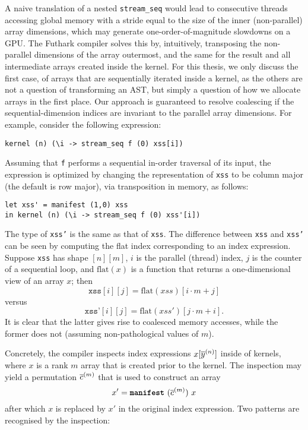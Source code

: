 A naive translation of a nested \lstinline{stream_seq} would lead to
consecutive threads accessing global memory with a stride equal to the
size of the inner (non-parallel) array dimensions, which may generate
one-order-of-magnitude slowdowns on a GPU.
%
The Futhark compiler solves this by, intuitively, transposing the
non-parallel dimensions of the array outermost, and the same for the
result and all intermediate arrays created inside the kernel.  For
this thesis, we only discuss the first case, of arrays that are
sequentially iterated inside a kernel, as the others are not a
question of transforming an AST, but simply a question of how we
allocate arrays in the first place.  Our approach is guaranteed to
resolve coalescing if the sequential-dimension indices are invariant
to the parallel array dimensions. For example, consider the following
expression:
\begin{lstlisting}[numbers=none]
kernel (n) (\i -> stream_seq f (0) xss[i])
\end{lstlisting}
Assuming that \lstinline{f} performs a sequential in-order traversal
of its input, the expression is optimized by changing the
representation of \texttt{xss} to be column major (the default is row
major), via transposition in memory, as follows:

\begin{lstlisting}[numbers=none]
let xss' = manifest (1,0) xss
in kernel (n) (\i -> stream_seq f (0) xss'[i])
\end{lstlisting}

The type of \texttt{xss'} is the same as that of \texttt{xss}.  The
difference between \texttt{xss} and \texttt{xss'} can be seen by
computing the flat index corresponding to an index expression.
Suppose \texttt{xss} has shape $[n][m]$, $i$ is the parallel (thread)
index, $j$ is the counter of a sequential loop, and $\textrm{flat}(x)$
is a function that returns a one-dimensional view of an array $x$;
then
\[
  \texttt{xss}[i][j] = \textrm{flat}(xss)[i\cdot{}m+j]
\]
versus
\[
  \texttt{xss'}[i][j] = \textrm{flat}(xss')[j\cdot{}m+i].
\]
It is clear that the latter gives rise to coalesced memory accesses,
while the former does not (assuming non-pathological values of $m$).

Concretely, the compiler inspects index expressions $x[\overline{y}^{(n)}]$
inside of kernels, where $x$ is a rank $m$ array that is created prior
to the kernel.  The inspection may yield a permutation $\overline{c}^{(m)}$
that is used to construct an array
\[
  x' = \mbox{\texttt{\bfseries{manifest}}}~(\overline{c}^{(m)})~x
\]
after which $x$ is replaced by $x'$ in the original index expression.
Two patterns are recognised by the inspection:

